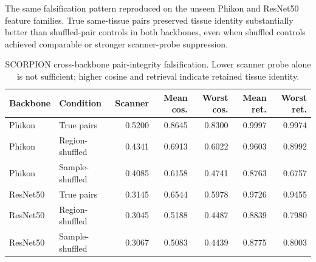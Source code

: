 \documentclass[10pt]{article}
\begin{document}
The same falsification pattern reproduced on the unseen Phikon and ResNet50 feature families. True same-tissue pairs preserved tissue identity substantially better than shuffled-pair controls in both backbones, even when shuffled controls achieved comparable or stronger scanner-probe suppression.

\begin{table}[t]
\centering
\caption{SCORPION cross-backbone pair-integrity falsification. Lower scanner probe alone is not sufficient; higher cosine and retrieval indicate retained tissue identity.}
\scriptsize
\setlength{\tabcolsep}{2.1pt}
\begin{tabular}{@{}llrrrrr@{}}
\toprule
Backbone & Condition & Scanner & Mean cos. & Worst cos. & Mean ret. & Worst ret. \\
\midrule
Phikon & True pairs & 0.5200 & 0.8645 & 0.8300 & 0.9997 & 0.9974 \\
Phikon & Region-shuffled & 0.4341 & 0.6913 & 0.6022 & 0.9603 & 0.8992 \\
Phikon & Sample-shuffled & 0.4085 & 0.6158 & 0.4741 & 0.8763 & 0.6757 \\
ResNet50 & True pairs & 0.3145 & 0.6544 & 0.5978 & 0.9726 & 0.9455 \\
ResNet50 & Region-shuffled & 0.3045 & 0.5188 & 0.4487 & 0.8839 & 0.7980 \\
ResNet50 & Sample-shuffled & 0.3067 & 0.5083 & 0.4439 & 0.8775 & 0.8003 \\
\bottomrule
\end{tabular}
\label{tab:crossbackbone_pair_integrity}
\end{table}
\end{document}
